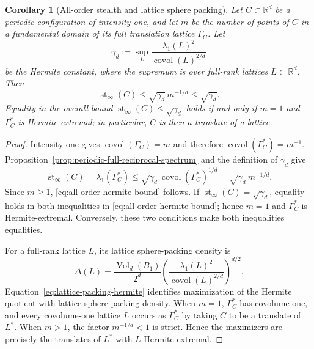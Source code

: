 \documentclass[11pt,reqno,a4paper]{amsart}
\numberwithin{equation}{section}
\theoremstyle{compact}
\newtheorem{corollary}[corollary]{Corollary}
\theoremstyle{definition}
\theoremstyle{definition}
\newcommand{\Vol}{\operatorname{Vol}}
\begin{document}
\begin{corollary}[All-order stealth and lattice sphere packing]
\label{cor:periodic-all-order-hermite}
Let $C\subset\mathbb R^d$ be a periodic configuration of intensity one, and
let $m$ be the number of points of $C$ in a fundamental domain of its full
translation lattice $\Gamma_C$.  Let
\[
  \gamma_d:=\sup_{L}
  \frac{\lambda_1(L)^2}{\operatorname{covol}(L)^{2/d}}
\]
be the Hermite constant, where the supremum is over full-rank lattices
$L\subset\mathbb R^d$.  Then
\begin{equation}\label{eq:all-order-hermite-bound}
  \operatorname{st}_\infty(C)
  \leq \sqrt{\gamma_d}\,m^{-1/d}
  \leq \sqrt{\gamma_d}.
\end{equation}
Equality in the overall bound
$\operatorname{st}_\infty(C)\leq\sqrt{\gamma_d}$ holds if and only if $m=1$
and $\Gamma_C^*$ is Hermite-extremal; in particular, $C$ is then a translate
of a lattice.
\end{corollary}

\begin{proof}
Intensity one gives
$\operatorname{covol}(\Gamma_C)=m$ and therefore
$\operatorname{covol}(\Gamma_C^*)=m^{-1}$.  Proposition~\ref{prop:periodic-full-reciprocal-spectrum} and the definition of $\gamma_d$
give
\[
  \operatorname{st}_\infty(C)
  =\lambda_1(\Gamma_C^*)
  \leq\sqrt{\gamma_d}\,
      \operatorname{covol}(\Gamma_C^*)^{1/d}
  =\sqrt{\gamma_d}\,m^{-1/d}.
\]
Since $m\geq1$, \eqref{eq:all-order-hermite-bound} follows.  If
$\operatorname{st}_\infty(C)=\sqrt{\gamma_d}$, equality holds in both
inequalities in \eqref{eq:all-order-hermite-bound}; hence $m=1$ and
$\Gamma_C^*$ is Hermite-extremal.  Conversely, these two conditions make both
inequalities equalities.

For a full-rank lattice $L$, its lattice sphere-packing density is
\begin{equation}\label{eq:lattice-packing-hermite}
  \Delta(L)
  =\frac{\Vol_d(B_1)}{2^d}
   \left(
     \frac{\lambda_1(L)^2}
          {\operatorname{covol}(L)^{2/d}}
   \right)^{d/2}.
\end{equation}
Equation~\eqref{eq:lattice-packing-hermite} identifies maximization of the
Hermite quotient with lattice sphere-packing density.  When $m=1$,
$\Gamma_C^*$ has covolume one, and every covolume-one lattice $L$ occurs as
$\Gamma_C^*$ by taking $C$ to be a translate of $L^*$.  When $m>1$, the factor
$m^{-1/d}<1$ is strict.  Hence the maximizers are precisely the translates of
$L^*$ with $L$ Hermite-extremal.
\end{proof}
\end{document}
